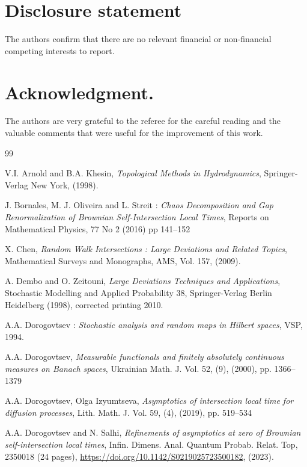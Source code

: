 \documentclass[]{interact}
\newcommand{\1}{\mathbf{1}}
\theoremstyle{plain}%
\theoremstyle{definition}
\theoremstyle{remark}
\begin{document}
\section*{Disclosure statement}
The authors confirm that there are no relevant financial or non-financial competing interests to report.

\section*{Acknowledgment.} The authors are very grateful to the referee for the careful reading and the valuable comments that were useful for the improvement of this work.


\begin{thebibliography}{99}

V.I. Arnold and B.A. Khesin, \emph{ Topological Methods in Hydrodynamics}, Springer-Verlag New York, (1998).


J. Bornales, M. J. Oliveira and L. Streit : \emph{Chaos Decomposition and Gap Renormalization of Brownian Self-Intersection Local Times}, Reports on Mathematical Physics, 77 No 2 (2016) pp 141--152 



X. Chen, \emph{ Random Walk Intersections : Large Deviations and Related Topics}, Mathematical Surveys and Monographs, AMS, Vol. 157, (2009).



A. Dembo and O. Zeitouni, \emph{Large Deviations Techniques and Applications}, Stochastic Modelling and Applied Probability 38, Springer-Verlag Berlin Heidelberg (1998), corrected printing 2010.

 A.A. Dorogovtsev : \emph{ Stochastic analysis and random maps in Hilbert spaces}, VSP, 1994.


A.A. Dorogovtsev, \emph{Measurable functionals and finitely absolutely continuous measures on Banach spaces}, Ukrainian Math. J. Vol. 52, (9),  (2000), pp. 1366--1379 

A.A. Dorogovtsev, Olga Izyumtseva, \emph{Asymptotics of intersection local time for diffusion processes}, Lith. Math. J. Vol. 59, (4), (2019), pp. 519--534 


A.A. Dorogovtsev and N. Salhi, \emph{Refinements of asymptotics at zero of Brownian self-intersection local times}, Infin. Dimens. Anal. Quantum Probab. Relat. Top, 2350018 (24 pages), \url{https://doi.org/10.1142/S0219025723500182}, (2023).



\end{thebibliography}
\end{document}
